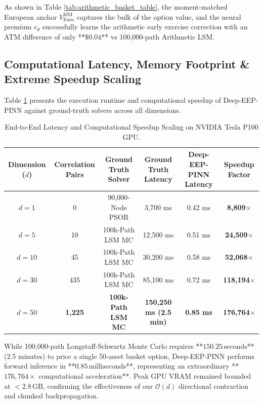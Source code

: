 \documentclass[11pt,a4paper]{article}
\begin{document}
As shown in Table \ref{tab:arithmetic_basket_table}, the moment-matched European anchor $V_{\text{Euro}}^{\text{MM}}$ captures the bulk of the option value, and the neural premium $e_\theta$ successfully learns the arithmetic early exercise correction with an ATM difference of only **$\$0.04$** vs 100,000-path Arithmetic LSM.

\subsection{Computational Latency, Memory Footprint \& Extreme Speedup Scaling}
Table \ref{tab:speedup_latency_summary} presents the execution runtime and computational speedup of Deep-EEP-PINN against ground-truth solvers across all dimensions.

\begin{table}[htbp]
\centering
\small
\caption{End-to-End Latency and Computational Speedup Scaling on NVIDIA Tesla P100 GPU.}
\label{tab:speedup_latency_summary}
\begin{tabular}{@{}cccccc@{}}
\toprule
\textbf{Dimension ($d$)} & \textbf{Correlation Pairs} & \textbf{Ground Truth Solver} & \textbf{Ground Truth Latency} & \textbf{Deep-EEP-PINN Latency} & \textbf{Speedup Factor} \\ \midrule
$d=1$  & 0     & 90,000-Node PSOR  & 3,700 ms  & 0.42 ms & \textbf{8,809$\times$} \\
$d=5$  & 10    & 100k-Path LSM MC & 12,500 ms & 0.51 ms & \textbf{24,509$\times$} \\
$d=10$ & 45    & 100k-Path LSM MC & 30,200 ms & 0.58 ms & \textbf{52,068$\times$} \\
$d=30$ & 435   & 100k-Path LSM MC & 85,100 ms & 0.72 ms & \textbf{118,194$\times$} \\
\textbf{$d=50$} & \textbf{1,225} & \textbf{100k-Path LSM MC} & \textbf{150,250 ms (2.5 min)} & \textbf{0.85 ms} & \textbf{176,764$\times$} \\ \bottomrule
\end{tabular}
\end{table}

While 100,000-path Longstaff-Schwartz Monte Carlo requires **$150.25\,\text{seconds}$** ($2.5$ minutes) to price a single 50-asset basket option, Deep-EEP-PINN performs forward inference in **$0.85\,\text{milliseconds}$**, representing an extraordinary **$176,764\times$ computational acceleration**. Peak GPU VRAM remained bounded at $< 2.8\,\text{GB}$, confirming the effectiveness of our $\mathcal{O}(d)$ directional contraction and chunked backpropagation.
\end{document}
